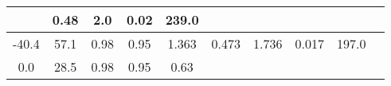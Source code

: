 \documentclass[a4paper,10pt]{article}
\begin{document}
\begin{longtable}{
     |
%    
    c|
%    
    c|
%    
    c|
%    
    c|
%    
    c|
%    
    c|
%    
    c|
%    
    c|
%    
    c|
%    
    c|
%    
    }
%        

%        
        & 0.48
%        

%        

%        
        & 2.0
%        

%        

%        
        & 0.02
%        

%        

%        
        & 239.0
%        

%        
        \\
        \hline

        

%        

%        
        -40.4
%        

%        

%        
        & 57.1
%        

%        

%        
        & 0.98
%        

%        

%        
        & 0.95
%        

%        

%        
        & 1.363
%        

%        

%        
        & 0.473
%        

%        

%        
        & 1.736
%        

%        

%        
        & 0.017
%        

%        

%        
        & 197.0
%        

%        
        \\
        \hline

        

%        

%        
        0.0
%        

%        

%        
        & 28.5
%        

%        

%        
        & 0.98
%        

%        

%        
        & 0.95
%        

%        

%        
        & 0.63
%        


\end{longtable}
\end{document}
